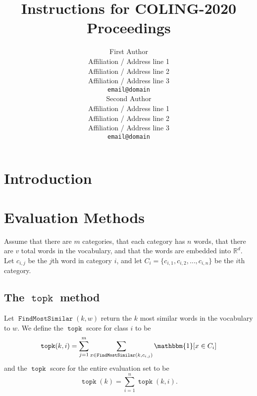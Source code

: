 \documentclass[11pt]{article}
\title{Instructions for COLING-2020 Proceedings}
\author{First Author \\
  Affiliation / Address line 1 \\
  Affiliation / Address line 2 \\
  Affiliation / Address line 3 \\
  {\tt email@domain} \\\And
  Second Author \\
  Affiliation / Address line 1 \\
  Affiliation / Address line 2 \\
  Affiliation / Address line 3 \\
  {\tt email@domain} \\}
\date{}
\newcommand{\indicator}[1]{\mathbbm{1}\!\left[{#1}\right]}
\newcommand{\R}{\mathbb R}
\DeclareMathOperator{\FindMostSimilar}{\texttt{FindMostSimilar}}
\DeclareMathOperator{\topk}{\texttt{topk}}
\begin{document}
\maketitle
\begin{abstract}
\end{abstract}

%
% 

\section{Introduction}
\label{sec:intro}

\section{Evaluation Methods}
\label{sec:method}
Assume that there are $m$ categories, that each category has $n$ words, that there are $v$ total words in the vocabulary, and that the words are embedded into $\R^d$.
Let $c_{i,j}$ be the $j$th word in category $i$,
and let $C_i = \{c_{i,1}, c_{i,2}, ..., c_{i,n}\}$ be the $i$th category.

\subsection{The $\topk$ method}
Let $\FindMostSimilar(k,w)$ return the $k$ most similar words in the vocabulary to $w$.
We define the $\topk$ score for class $i$ to be
\begin{equation}
    \topk(k,i) = \sum_{j=1}^m \sum_{x \in \FindMostSimilar(k, c_{i,j})} \indicator{x \in C_i}
\end{equation}
and the $\topk$ score for the entire evaluation set to be
\begin{equation}
    \topk(k) = \sum_{i=1}^n \topk(k,i)
    .
\end{equation}
\end{document}

